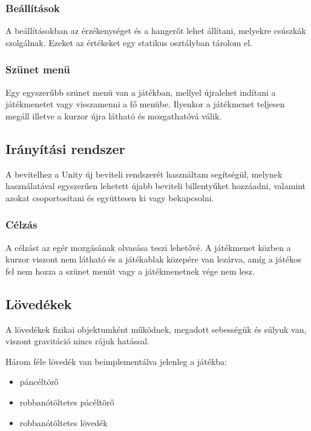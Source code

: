 \documentclass[
]{thesis-ekf}
\theoremstyle{definition}
\theoremstyle{remark}
\begin{document}
\subsubsection{Beállítások}

A beállításokban az érzékenységet és a hangerőt lehet állítani, melyekre csúszkák szolgálnak. Ezeket az értékeket egy statikus osztályban tárolom el.


\subsubsection{Szünet menü}

Egy egyszerűbb szünet menü van a játékban, mellyel újralehet indítani a játékmenetet vagy visszamenni a fő menübe. Ilyenkor a játékmenet teljesen megáll illetve a kurzor újra látható és mozgathatóvá válik.

\subsection{Irányítási rendszer}

A bevitelhez a Unity új beviteli rendszerét használtam segítségül, melynek használatával egyszerűen lehetett újabb beviteli billentyűket hozzáadni, valamint azokat csoportosítani és együttesen ki vagy bekapcsolni.

\subsubsection{Célzás}

A célzást az egér mozgásának olvasása teszi lehetővé. A játékmenet közben a kurzor viszont nem látható és a játékablak közepére van lezárva, amíg a játékos fel nem hozza a szünet menüt vagy a játékmenetnek vége nem lesz.

\subsection{Lövedékek}

A lövedékek fizikai objektumként működnek, megadott sebességük és súlyuk van, viszont gravitáció nincs rájuk hatással.

Három féle lövedék van beimplementálva jelenleg a játékba:
\begin{itemize}
    \item páncéltörő
    \item robbanótöltetes pácéltörő
    \item robbanótöltetes lövedék
\end{itemize}
\end{document}
